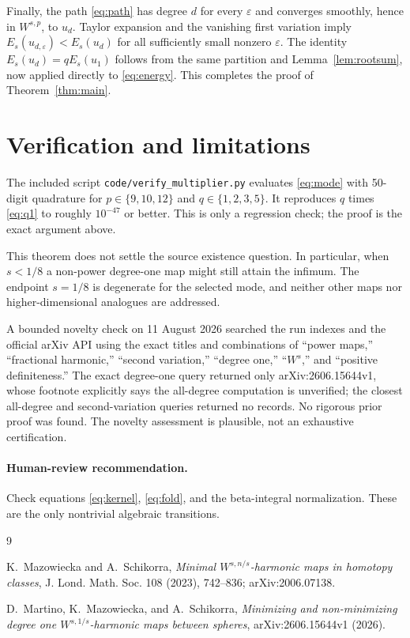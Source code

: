 \documentclass[11pt]{article}
\begin{document}
Finally, the path \eqref{eq:path} has degree $d$ for every $\varepsilon$ and
converges smoothly, hence in $W^{s,p}$, to $u_d$.  Taylor expansion and the
vanishing first variation imply
$E_s(u_{d,\varepsilon})<E_s(u_d)$ for all sufficiently small nonzero
$\varepsilon$.  The identity $E_s(u_d)=qE_s(u_1)$ follows from the same
partition and Lemma~\ref{lem:rootsum}, now applied directly to
\eqref{eq:energy}.  This completes the proof of Theorem~\ref{thm:main}.

\section{Verification and limitations}

The included script \texttt{code/verify\_multiplier.py} evaluates
\eqref{eq:mode} with 50-digit quadrature for
$p\in\{9,10,12\}$ and $q\in\{1,2,3,5\}$.  It reproduces
$q$ times \eqref{eq:q1} to roughly $10^{-47}$ or better.  This is only a
regression check; the proof is the exact argument above.

This theorem does not settle the source existence question.  In particular,
when $s<1/8$ a non-power degree-one map might still attain the infimum.  The
endpoint $s=1/8$ is degenerate for the selected mode, and neither other maps
nor higher-dimensional analogues are addressed.

A bounded novelty check on 11 August 2026 searched the run indexes and the
official arXiv API using the exact titles and combinations of ``power maps,''
``fractional harmonic,'' ``second variation,'' ``degree one,'' ``$W^s$,'' and
``positive definiteness.''  The exact degree-one query returned only
arXiv:2606.15644v1, whose footnote explicitly says the all-degree computation
is unverified; the closest all-degree and second-variation queries returned no
records.  No rigorous prior proof was found.  The novelty assessment is
plausible, not an exhaustive certification.

\paragraph{Human-review recommendation.}
Check equations \eqref{eq:kernel}, \eqref{eq:fold}, and the beta-integral
normalization.  These are the only nontrivial algebraic transitions.

\begin{thebibliography}{9}

K.~Mazowiecka and A.~Schikorra,
\emph{Minimal $W^{s,n/s}$-harmonic maps in homotopy classes},
J. Lond. Math. Soc. 108 (2023), 742--836;
arXiv:2006.07138.

D.~Martino, K.~Mazowiecka, and A.~Schikorra,
\emph{Minimizing and non-minimizing degree one
$W^{s,1/s}$-harmonic maps between spheres},
arXiv:2606.15644v1 (2026).

\end{thebibliography}
\end{document}
